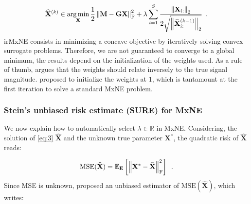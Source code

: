 \begin{equation} \label{eq:5}
    \widehat{\mathbf{X}}^{(k)}
    \in
    \operatorname*{arg\,min}_{\mathbf{X}}
    \frac{1}{2}\left \lVert \mathbf{M - GX} \right \rVert^2_{\text{F}}
    + \lambda \sum_{i=1}^{S}
    \frac{\left \lVert \mathbf{X}_{i:} \right \rVert_2}
    {2 \sqrt{\left \lVert \widehat{\mathbf{X}}^{(k-1)}_{i:} \right \rVert_2}}
    \enspace .
\end{equation}
%
irMxNE consists in minimizing a concave objective by iteratively solving convex surrogate problems. Therefore, we are not guaranteed to
converge to a global minimum, the results depend on the initialization of the weights used. As a rule of thumb, \cite{Candes_Wakin_Boyd08} argues
that the weights should relate inversely to the true signal magnitude. \cite{Strohmeier_Bekhti_Haueisen_Gramfort_2016} proposed to initialize
the weights at 1, which is tantamount at the first iteration to solve a standard MxNE problem.

\subsubsection{Stein's unbiased risk estimate (SURE) for MxNE}

We now explain how to automatically select $\lambda \in \mathbb{R}$ in MxNE. Considering, the solution of
\eqref{eq:3} $\widehat{\mathbf{X}}$ and the unknown true parameter $\mathbf{X}^*$, the quadratic risk of $\widehat{\mathbf{X}}$
reads:

\begin{equation} \label{eq:6}
    \text{MSE}(\widehat{\mathbf{X}})
    = \mathbb{E}_{\mathbf{E}}
    \left[
        \left \lVert 
            \mathbf{X}^* - \widehat{\mathbf{X}}
         \right \rVert_{\text{F}}^2
    \right]
    \enspace .
\end{equation}
%
Since MSE is unknown, \cite{Stein81} proposed an unbiased estimator of $\text{MSE}(\widehat{\mathbf{X}})$,
which writes:


